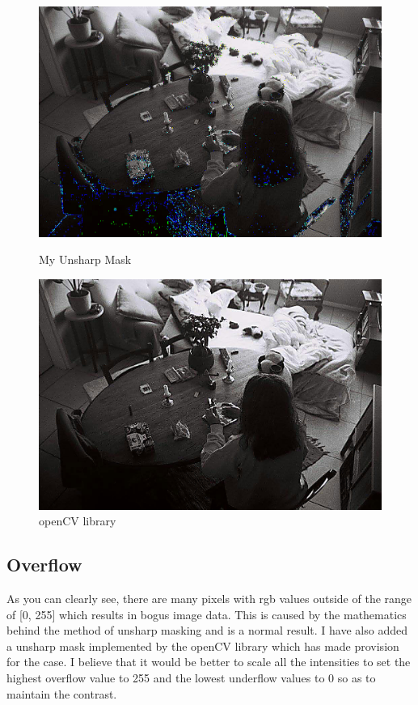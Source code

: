 \documentclass{article}
\begin{document}
\begin{figure}[h!]
\centering
  \begin{minipage}[b]{0.45\textwidth}
    \includegraphics[width=\textwidth]{Q2_fin.png}
    \caption{My Unsharp Mask}
  \end{minipage}
  \hfill
  \begin{minipage}[b]{0.45\textwidth}
    \includegraphics[width=\textwidth]{Q2_cv2.png}
    \caption{openCV library}
  \end{minipage}
\end{figure}

\subsection{Overflow}
As you can clearly see, there are many pixels with rgb values outside of the range of [0, 255] which results in bogus image data. This is caused by the mathematics behind the method of unsharp masking and is a normal result. I have also added a unsharp mask implemented by the openCV library which has made provision for the case. I believe that it would be better to scale all the intensities to set the highest overflow value to 255 and the lowest underflow values to 0 so as to maintain the contrast.
\end{document}
